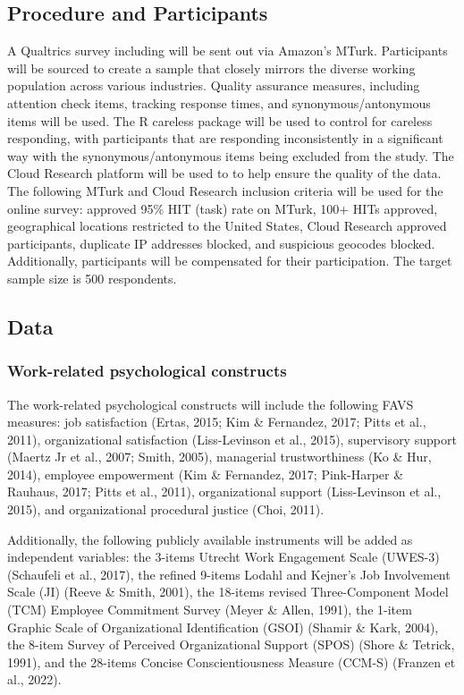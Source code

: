 \documentclass[
  jou]{apa6}
\begin{document}
\hypertarget{procedure-and-participants-1}{%
\subsection{Procedure and Participants}\label{procedure-and-participants-1}}

A Qualtrics survey including will be sent out via Amazon's MTurk. Participants will be sourced to create a sample that closely mirrors the diverse working population across various industries. Quality assurance measures, including attention check items, tracking response times, and synonymous/antonymous items will be used. The R careless package will be used to control for careless responding, with participants that are responding inconsistently in a significant way with the synonymous/antonymous items being excluded from the study. The Cloud Research platform will be used to to help ensure the quality of the data. The following MTurk and Cloud Research inclusion criteria will be used for the online survey: approved 95\% HIT (task) rate on MTurk, 100+ HITs approved, geographical locations restricted to the United States, Cloud Research approved participants, duplicate IP addresses blocked, and suspicious geocodes blocked. Additionally, participants will be compensated for their participation. The target sample size is 500 respondents.

\hypertarget{data-1}{%
\subsection{Data}\label{data-1}}

\hypertarget{work-related-psychological-constructs}{%
\subsubsection{Work-related psychological constructs}\label{work-related-psychological-constructs}}

The work-related psychological constructs will include the following FAVS measures: job satisfaction (Ertas, 2015; Kim \& Fernandez, 2017; Pitts et al., 2011), organizational satisfaction (Liss-Levinson et al., 2015), supervisory support (Maertz Jr et al., 2007; Smith, 2005), managerial trustworthiness (Ko \& Hur, 2014), employee empowerment (Kim \& Fernandez, 2017; Pink-Harper \& Rauhaus, 2017; Pitts et al., 2011), organizational support (Liss-Levinson et al., 2015), and organizational procedural justice (Choi, 2011).

Additionally, the following publicly available instruments will be added as independent variables: the 3-items Utrecht Work Engagement Scale (UWES-3) (Schaufeli et al., 2017), the refined 9-items Lodahl and Kejner's Job Involvement Scale (JI) (Reeve \& Smith, 2001), the 18-items revised Three-Component Model (TCM) Employee Commitment Survey (Meyer \& Allen, 1991), the 1-item Graphic Scale of Organizational Identification (GSOI) (Shamir \& Kark, 2004), the 8-item Survey of Perceived Organizational Support (SPOS) (Shore \& Tetrick, 1991), and the 28-items Concise Conscientiousness Measure (CCM-S) (Franzen et al., 2022).
\end{document}
